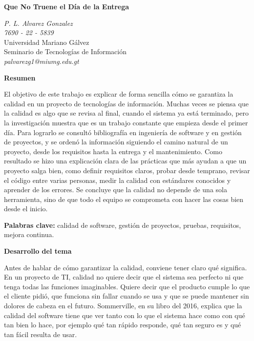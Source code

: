 \documentclass[12pt,letterpaper]{article}
\begin{document}
\begin{center}
\textbf{\Large Que No Truene el Día de la Entrega}
\end{center}

\begin{center}
\textit{P. L. Alvarez Gonzalez} \\
\textit{7690 - 22 - 5839} \\
Universidad Mariano Gálvez \\
Seminario de Tecnologías de Información \\
\textit{palvarezg1@miumg.edu.gt}
\end{center}

\vspace{0.5cm}

\textbf{Resumen}

El objetivo de este trabajo es explicar de forma sencilla cómo se garantiza la calidad en un proyecto de tecnologías de información. Muchas veces se piensa que la calidad es algo que se revisa al final, cuando el sistema ya está terminado, pero la investigación muestra que es un trabajo constante que empieza desde el primer día. Para lograrlo se consultó bibliografía en ingeniería de software y en gestión de proyectos, y se ordenó la información siguiendo el camino natural de un proyecto, desde los requisitos hasta la entrega y el mantenimiento. Como resultado se hizo una explicación clara de las prácticas que más ayudan a que un proyecto salga bien, como definir requisitos claros, probar desde temprano, revisar el código entre varias personas, medir la calidad con estándares conocidos y aprender de los errores. Se concluye que la calidad no depende de una sola herramienta, sino de que todo el equipo se comprometa con hacer las cosas bien desde el inicio.

\textbf{Palabras clave:} calidad de software, gestión de proyectos, pruebas, requisitos, mejora continua.

\textbf{Desarrollo del tema}

Antes de hablar de cómo garantizar la calidad, conviene tener claro qué significa. En un proyecto de TI, calidad no quiere decir que el sistema sea perfecto ni que tenga todas las funciones imaginables. Quiere decir que el producto cumple lo que el cliente pidió, que funciona sin fallar cuando se usa y que se puede mantener sin dolores de cabeza en el futuro. Sommerville, en su libro del 2016, explica que la calidad del software tiene que ver tanto con lo que el sistema hace como con qué tan bien lo hace, por ejemplo qué tan rápido responde, qué tan seguro es y qué tan fácil resulta de usar.
\end{document}
